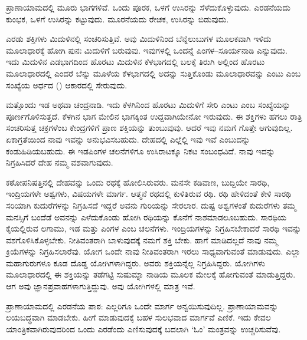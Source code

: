 \vskip 2pt

ಪ್ರಾಣಾಯಾಮದಲ್ಲಿ ಮೂರು ಭಾಗಗಳಿವೆ. ಒಂದು ಪೂರಕ, ಒಳಗೆ ಉಸಿರನ್ನು ಸೆಳೆದುಕೊಳ್ಳುವುದು. ಎರಡನೆಯದು ಕುಂಭಕ, ಒಳಗೆ ಉಸಿರನ್ನು ಕಟ್ಟುವುದು. ಮೂರನೆಯದು ರೇಚಕ, ಉಸಿರನ್ನು ಬಿಡುವುದು.

\vskip 2pt

ಎರಡು ಶಕ್ತಿಗಳು ಮಿದುಳಿನಲ್ಲಿ ಸಂಚರಿಸುತ್ತಿವೆ. ಅವು ಮಿದುಳಿನಿಂದ ಬೆನ್ನೆಲುಬುಗಳ ಮೂಲಕವಾಗಿ ಇಳಿದು ಮೂಲಾಧಾರಕ್ಕೆ ಹೋಗಿ ಪುನಃ ಮಿದುಳಿಗೆ ಬರುವುವು. ಇವುಗಳಲ್ಲಿ ಒಂದನ್ನೆ ಪಿಂಗಳ–ಸೂರ್ಯನಾಡಿ ಎನ್ನುವುದು. ಇದು ಮಿದುಳಿನ ಎಡಭಾಗದಿಂದ ಹೊರಟು ಮಿದುಳಿನ ಕೆಳಭಾಗದಲ್ಲಿ ಬಲಕ್ಕೆ ತಿರುಗಿ ಅಲ್ಲಿಂದ ಹೊರಟು ಮೂಲಾಧಾರದಲ್ಲಿ ಎಂದರೆ ಬೆನ್ನು ಮೂಳೆಯ ಕೆಳಭಾಗದಲ್ಲಿ ಅದನ್ನು ಸುತ್ತಿಕೊಂಡು ಮೂಲಾಧಾರವನ್ನು ಎಂಟು ಎಂಬ ಸಂಖ್ಯೆಯ ಅರ್ಧದ () ಆಕಾರದಲ್ಲಿ ಸೇರುವುದು.

\vskip 2pt

ಮತ್ತೊಂದು ಇಡ ಅಥವಾ ಚಂದ್ರನಾಡಿ. ಇದು ಕೆಳಗಿನಿಂದ ಹೊರಟು ಮಿದುಳಿಗೆ ಸೇರಿ ಎಂಟು ಎಂಬ ಸಂಖ್ಯೆಯನ್ನು ಪೂರ್ಣಗೊಳಿಸುತ್ತದೆ. ಕೆಳಗಿನ ಭಾಗ ಮೇಲಿನ ಭಾಗಕ್ಕಿಂತ ಉದ್ದವಾಗಿಯೇನೋ ಇರುವುದು. ಈ ಶಕ್ತಿಗಳು ಹಗಲು ರಾತ್ರಿ ಸಂಚರಿಸುತ್ತ ಚಕ್ರಗಳೆಂಬ ಕೇಂದ್ರಗಳಿಗೆ ಪ್ರಾಣ ಶಕ್ತಿಯನ್ನು ತುಂಬುವುವು. ಆದರೆ ಇವು ನಮಗೆ ಗೊತ್ತೇ ಆಗುವುದಿಲ್ಲ. ಏಕಾಗ್ರತೆಯಿಂದ ನಾವು ಇವನ್ನು ಅನುಭವಿಸಬಹುದು. ದೇಹದಲ್ಲಿ ಎಲ್ಲೆಲ್ಲಿ ಇವು ಇವೆ ಎಂಬುದನ್ನು ಕಂಡುಹಿಡಿಯಬಹುದು. ಈ ಇಡಪಿಂಗಳ ಚಲನೆಗಳಿಗೂ ಉಸಿರಾಟಕ್ಕೂ ನಿಕಟ ಸಂಬಂಧವಿದೆ. ನಾವು ಇದನ್ನು ನಿಗ್ರಹಿಸಿದರೆ ದೇಹ ನಮ್ಮ ವಶವಾಗುವುದು.

\vskip 2pt

ಕಠೋಪನಿಷತ್ತಿನಲ್ಲಿ ದೇಹವನ್ನು ಒಂದು ರಥಕ್ಕೆ ಹೋಲಿಸಿರುವರು. ಮನಸೇ ಕಡಿವಾಣ, ಬುದ್ದಿಯೇ ಸಾರಥಿ, ಇಂದ್ರಿಯಗಳೇ ಅಶ್ವಗಳು, ವಿಷಯಗಳೇ ಮಾರ್ಗ. ಆತ್ಮನೆ ರಥದಲ್ಲಿ ಕುಳಿತಿರುವ ರಥಿ. ರಥಿ ಹೇಳಿದಂತೆ ಕೇಳಿ ಸಾರಥಿ ಸರಿಯಾಗಿ ಕುದುರೆಗಳನ್ನು ನಿಗ್ರಹಿಸದೆ ಇದ್ದರೆ ಅವನು ಗುರಿಯನ್ನು ಸೇರಲಾರ. ದುಷ್ಟ ಅಶ್ವಗಳಂತೆ ಕುದುರೆಗಳು ತಮ್ಮ ಮನಸ್ಸಿಗೆ ಬಂದೆಡೆ ಅವನನ್ನು ಎಳೆದುಕೊಂಡು ಹೋಗಿ ರಥಿಯನ್ನು ಕೊನೆಗೆ ನಾಶ\break ಮಾಡಲೂಬಹುದು. ಸಾರಥಿಯ ಕೈಯಲ್ಲಿರುವ ಲಗಾಮು, ಇಡ ಮತ್ತು ಪಿಂಗಳ ಎಂಬ ಚಲನೆಗಳು. ಇಂದ್ರಿಯಗಳನ್ನು ನಿಗ್ರಹಿಸಬೇಕಾದರೆ ಸಾರಥಿ ಇವನ್ನು ವಶಗೊಳಿಸಿಕೊಳ್ಳ\-ಬೇಕು. ನೀತಿವಂತರಾಗಿ ಬಾಳುವುದಕ್ಕೆ ನಮಗೆ ಶಕ್ತಿ ಬೇಕು. ಹಾಗೆ ಮಾಡಿದಲ್ಲದೆ ನಾವು ನಮ್ಮ ಕ್ರಿಯೆಗಳನ್ನು ನಿಗ್ರಹಿಸಲಾರೆವು. ಯೋಗ ಒಂದೇ ನಾವು ನೀತಿವಂತರಾಗಿ ಇರಲು ಸಾಧ್ಯವಾಗುವಂತೆ ಮಾಡುವುದು. ಎಲ್ಲಾ ಮಹಾಗುರುಗಳೂ ಕೂಡ ದೊಡ್ಡ ಯೋಗಿಗಳಾಗಿದ್ದರು. ಅವರು ಶಕ್ತಿಯನ್ನೆಲ್ಲ ನಿಗ್ರಹಿಸಿದ್ದರು. ಯೋಗಿಗಳು ಮೂಲಾಧಾರದಲ್ಲಿ ಈ ಶಕ್ತಿಯನ್ನು ತಡೆಗಟ್ಟಿ ಸುಷುಮ್ನಾ ನಾಡಿಯ ಮೂಲಕ ಮೇಲಕ್ಕೆ ಹೋಗುವಂತೆ ಮಾಡುತ್ತಿದ್ದರು. ಆಗ ಅವು ಜ್ಞಾನಪ್ರವಾಹಗಳಾಗುತ್ತಿದ್ದುವು. ಅವು ಯೋಗಿಗಳಲ್ಲಿ ಮಾತ್ರ ಇವೆ.

\vskip 2pt

ಪ್ರಾಣಾಯಾಮದಲ್ಲಿ ಎರಡನೆಯ ಪಾಠ: ಎಲ್ಲರಿಗೂ ಒಂದೇ ಮಾರ್ಗ ಅನ್ವಯಿಸುವುದಿಲ್ಲ. ಪ್ರಾಣಾಯಾಮವನ್ನು ಲಯಬದ್ಧವಾಗಿ ಮಾಡಬೇಕು. ಹೀಗೆ ಮಾಡುವುದಕ್ಕೆ ಬಹಳ ಸುಲಭವಾದ ಮಾರ್ಗವೆ ಎಣಿಕೆ. ಇದು ಕೇವಲ ಯಾಂತ್ರಿಕವಾಗಿರುವುದರಿಂದ ಒಂದು ಎರಡೆಂದು ಎಣಿಸುವುದಕ್ಕೆ ಬದಲಾಗಿ `ಓಂ' ಮಂತ್ರವನ್ನು ಉಚ್ಚರಿಸುವೆವು.

\vskip 2pt

